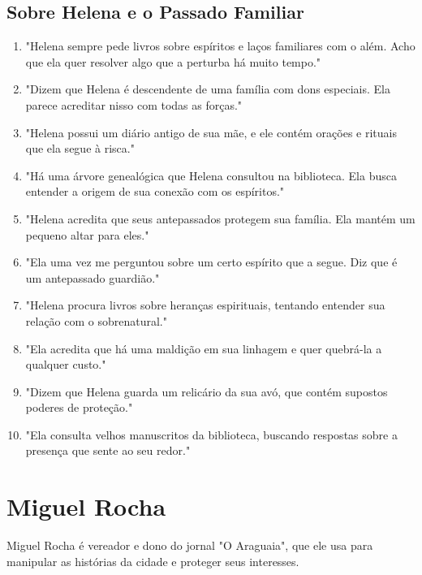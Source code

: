\subsection*{Sobre Helena e o Passado Familiar}
\begin{enumerate}
    \item "Helena sempre pede livros sobre espíritos e laços familiares com o além. Acho que ela quer resolver algo que a perturba há muito tempo."
    \item "Dizem que Helena é descendente de uma família com dons especiais. Ela parece acreditar nisso com todas as forças."
    \item "Helena possui um diário antigo de sua mãe, e ele contém orações e rituais que ela segue à risca."
    \item "Há uma árvore genealógica que Helena consultou na biblioteca. Ela busca entender a origem de sua conexão com os espíritos."
    \item "Helena acredita que seus antepassados protegem sua família. Ela mantém um pequeno altar para eles."
    \item "Ela uma vez me perguntou sobre um certo espírito que a segue. Diz que é um antepassado guardião."
    \item "Helena procura livros sobre heranças espirituais, tentando entender sua relação com o sobrenatural."
    \item "Ela acredita que há uma maldição em sua linhagem e quer quebrá-la a qualquer custo."
    \item "Dizem que Helena guarda um relicário da sua avó, que contém supostos poderes de proteção."
    \item "Ela consulta velhos manuscritos da biblioteca, buscando respostas sobre a presença que sente ao seu redor."
\end{enumerate}

\section{Miguel Rocha}
Miguel Rocha é vereador e dono do jornal "O Araguaia", que ele usa para manipular as histórias da cidade e proteger seus interesses.

